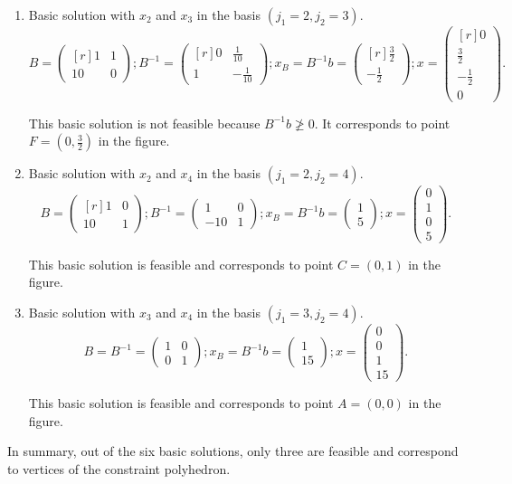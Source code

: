 \begin{enumerate}
This basic solution is feasible and corresponds to point $B=(1,0)$ .

\item Basic solution with $x_2$ and $x_3$ in the basis $(j_1=2,j_2=3)$.
\[
B =
\begin{pmatrix*}[r]
1 & 1\\
10 &0
\end{pmatrix*};
B^{-1} =
\begin{pmatrix*}[r]
0 & \frac{1}{10}\\
1 & -\frac{1}{10}
\end{pmatrix*};
x_B = B^{-1}b =
\begin{pmatrix*}[r]
\frac{3}{2} \\
-\frac{1}{2}
\end{pmatrix*};
x =
\begin{pmatrix*}[r]
0 \\
\frac{3}{2} \\
-\frac{1}{2} \\
0
\end{pmatrix*}.
\]

This basic solution is not feasible because $B^{-1}b\ngeqslant0$. It corresponds to point $F=(0,\frac{3}{2})$ in the figure.

\item Basic solution with $x_2$ and $x_4$ in the basis $(j_1=2,j_2=4)$.
\[
B = 
\begin{pmatrix*}[r]
1 & 0\\
10 &1
\end{pmatrix*};
B^{-1} =
\begin{pmatrix}
1 & 0\\
-10 & 1
\end{pmatrix};
x_B = B^{-1}b =
\begin{pmatrix}
1 \\
5
\end{pmatrix};
x =
\begin{pmatrix}
0 \\
1 \\
0 \\
5
\end{pmatrix}.
\]

This basic solution is feasible and corresponds to point $C=(0,1)$ in the figure.

\item Basic solution with $x_3$ and $x_4$ in the basis $(j_1=3,j_2=4)$.
\[
B = B^{-1} =
\begin{pmatrix}
1 & 0\\
0 & 1
\end{pmatrix};
x_B = B^{-1}b =
\begin{pmatrix}
1 \\
15
\end{pmatrix};
x =
\begin{pmatrix}
0 \\
0 \\
1 \\
15
\end{pmatrix}.
\]

This basic solution is feasible and corresponds to point $A=(0,0)$ in the figure.
\end{enumerate}

In summary, out of the six basic solutions, only three are feasible
and correspond to vertices of the constraint polyhedron. 


